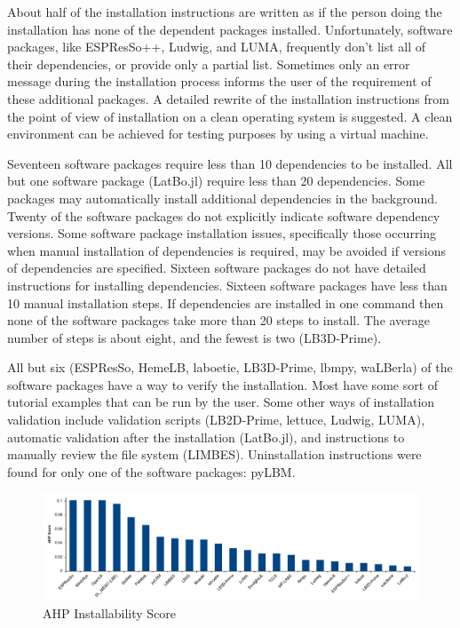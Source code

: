 \documentclass[final, 3p, times, authoryear]{elsarticle}
\begin{document}
About half of the installation instructions are written as if the person doing
the installation has none of the dependent packages installed. Unfortunately,
software packages, like ESPResSo++, Ludwig, and LUMA, frequently don't list all
of their dependencies, or provide only a partial list. Sometimes only an error
message during the installation process informs the user of the requirement of
these additional packages. A detailed rewrite of the installation instructions
from the point of view of installation on a clean operating system is suggested.
A clean environment can be achieved for testing purposes by using a virtual
machine.

Seventeen software packages require less than 10 dependencies to be installed. All but one software package (LatBo.jl) require less than 20 dependencies. Some
packages may automatically install additional dependencies in the background.
Twenty of the software packages do not explicitly indicate software dependency
versions. Some software package installation issues, specifically those
occurring when manual installation of dependencies is required, may be avoided
if versions of dependencies are specified. Sixteen software packages do not have
detailed instructions for installing dependencies. Sixteen software packages
have less than 10 manual installation steps. If dependencies are installed in
one command then none of the software packages take more than 20 steps to
install. The average number of steps is about eight, and the fewest is two
(LB3D-Prime). 

All but six (ESPResSo, HemeLB, laboetie, LB3D-Prime, lbmpy, waLBerla) of the
software packages have a way to verify the installation. Most have some sort of
tutorial examples that can be run by the user. Some other ways of installation
validation include validation scripts (LB2D-Prime, lettuce, Ludwig, LUMA),
automatic validation after the installation (LatBo.jl), and instructions to
manually review the file system (LIMBES).  Uninstallation instructions were
found for only one of the software packages: pyLBM.

\begin{figure}[h!]
	\begin{center}
		\includegraphics[width=1.0\textwidth]{./figures/installability_chart.pdf}
		\caption{AHP Installability Score}
		\label{Fig_Installability}
	\end{center}
\end{figure}
\end{document}
